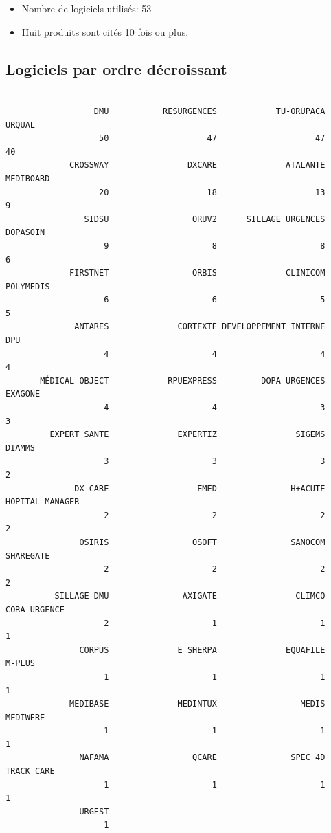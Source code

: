 \documentclass[]{article}
\providecommand{\tightlist}{%
  \setlength{\itemsep}{0pt}\setlength{\parskip}{0pt}}
\begin{document}
\begin{itemize}
\tightlist
\item
  Nombre de logiciels utilisés: 53
\item
  Huit produits sont cités 10 fois ou plus.
\end{itemize}

\subsection{Logiciels par ordre
décroissant}\label{logiciels-par-ordre-decroissant}

\begin{verbatim}

                  DMU           RESURGENCES            TU-ORUPACA                URQUAL 
                   50                    47                    47                    40 
             CROSSWAY                DXCARE              ATALANTE             MEDIBOARD 
                   20                    18                    13                     9 
                SIDSU                 ORUV2      SILLAGE URGENCES              DOPASOIN 
                    9                     8                     8                     6 
             FIRSTNET                 ORBIS              CLINICOM             POLYMEDIS 
                    6                     6                     5                     5 
              ANTARES              CORTEXTE DEVELOPPEMENT INTERNE                   DPU 
                    4                     4                     4                     4 
       MÉDICAL OBJECT            RPUEXPRESS         DOPA URGENCES               EXAGONE 
                    4                     4                     3                     3 
         EXPERT SANTE              EXPERTIZ                SIGEMS                DIAMMS 
                    3                     3                     3                     2 
              DX CARE                  EMED               H+ACUTE       HOPITAL MANAGER 
                    2                     2                     2                     2 
               OSIRIS                 OSOFT               SANOCOM             SHAREGATE 
                    2                     2                     2                     2 
          SILLAGE DMU               AXIGATE                CLIMCO          CORA URGENCE 
                    2                     1                     1                     1 
               CORPUS              E SHERPA              EQUAFILE                M-PLUS 
                    1                     1                     1                     1 
             MEDIBASE              MEDINTUX                 MEDIS              MEDIWERE 
                    1                     1                     1                     1 
               NAFAMA                 QCARE               SPEC 4D            TRACK CARE 
                    1                     1                     1                     1 
               URGEST 
                    1 
\end{verbatim}
\end{document}
